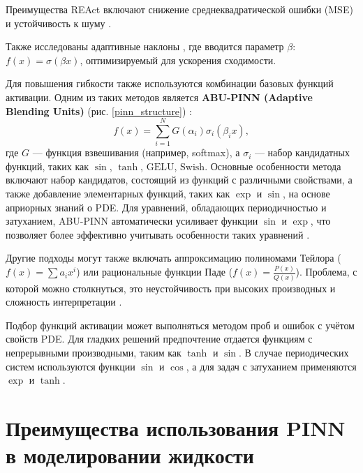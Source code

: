 Преимущества REAct включают снижение среднеквадратической ошибки (MSE) и устойчивость к шуму
\cite{0d752c79fb816703274a3d37f85a85689a2a9405}.

Также исследованы адаптивные наклоны \cite{7fcd4b3c875d8e41eb0c184aa1a42bf4c8906d61}, где вводится параметр
$\beta$: $f(x) = \sigma(\beta x)$, оптимизируемый для ускорения сходимости.

Для повышения гибкости также используются комбинации базовых функций активации. Одним из таких методов является
\textbf{ABU-PINN (Adaptive Blending Units)} (рис. \ref{pinn_structure}) \cite{Sutfeld2018-io}\cite{7fcd4b3c875d8e41eb0c184aa1a42bf4c8906d61}:
\begin{equation}
f(x) = \sum_{i=1}^N G(\alpha_i) \sigma_i(\beta_i x),
\end{equation}
где $G$ — функция взвешивания (например, softmax), а $\sigma_i$ — набор кандидатных функций, таких как
$\sin$, $\tanh$, $\mathrm{GELU}$, $\mathrm{Swish}$. 
Основные особенности метода включают набор кандидатов, состоящий из функций с различными свойствами, а
также добавление элементарных функций, таких как $\exp$ и $\sin$, на основе априорных знаний о PDE.
Для уравнений, обладающих периодичностью и затуханием, ABU-PINN автоматически усиливает функции
$\sin$ и $\exp$, что позволяет более эффективно учитывать особенности таких уравнений
\cite{7fcd4b3c875d8e41eb0c184aa1a42bf4c8906d61}.



Другие подходы могут также включать аппроксимацию полиномами Тейлора ($f(x) = \sum a_i x^i$) или
рациональные функции Паде ($f(x) = \frac{P(x)}{Q(x)}$).
Проблема, с которой можно столкнуться, это неустойчивость при высоких производных и сложность
интерпретации \cite{7fcd4b3c875d8e41eb0c184aa1a42bf4c8906d61}.

Подбор функций активации может выполняться методом проб и ошибок с учётом свойств PDE. Для гладких решений
предпочтение отдается функциям с непрерывными производными, таким как $\tanh$ и $\sin$. В случае периодических
систем используются функции $\sin$ и $\cos$, а для задач с затуханием применяются $\exp$ и $\tanh$.


\section{Преимущества использования PINN в моделировании жидкости}
